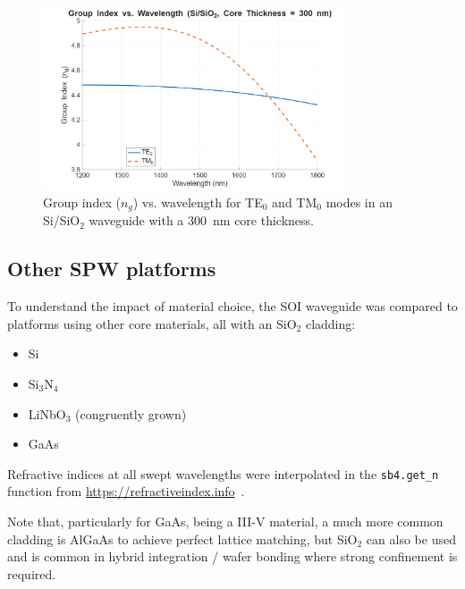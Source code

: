 \documentclass[10pt, a4paper]{article}
\begin{document}
\begin{figure}[h!]
    \centering
    \includegraphics[width=0.8\textwidth]{task1/group_index_TE0_TM0_vs_wavelength_d300nm.png}
    \caption{Group index ($n_g$) vs. wavelength for TE$_0$ and TM$_0$ modes in an Si/SiO$_2$ waveguide with a 300~nm core thickness.}
    \label{fig:group_index_TE0_TM0_vs_wavelength}
\end{figure}

\subsection{Other SPW platforms}
To understand the impact of material choice, the SOI waveguide was compared to platforms using other core materials, all with an SiO$_2$ cladding:

\begin{itemize}
    \item Si\autocite{aspnesDielectricFunctionsOptical1983}
    \item Si$_3$N$_4$\autocite{lukeBroadbandMidinfraredFrequency2015}
    \item LiNbO$_3$\autocite{zelmonInfraredCorrectedSellmeier1997} (congruently grown)
    \item GaAs\autocite{adachiOpticalDispersionRelations1989}
\end{itemize}

Refractive indices at all swept wavelengths were interpolated in the \texttt{sb4.get\_n} function from \url{https://refractiveindex.info}~\autocite{polyanskiyRefractiveindexinfoDatabaseOptical2024}.

Note that, particularly for GaAs, being a III-V material, a much more common cladding is AlGaAs to achieve perfect lattice matching, but SiO$_2$ can also be used and is common in hybrid integration / wafer bonding where strong confinement is required.
\end{document}
